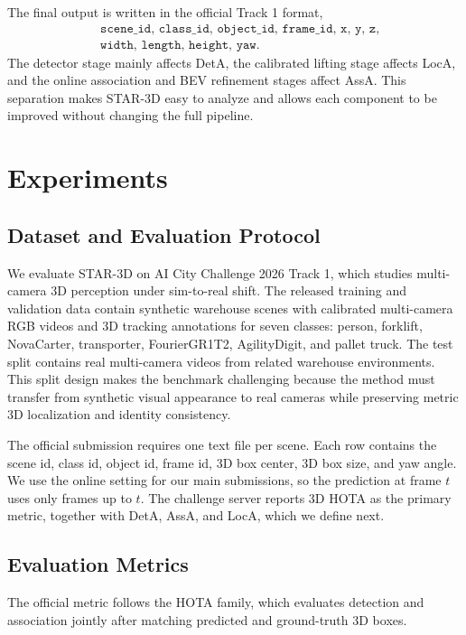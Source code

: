 \documentclass[runningheads]{llncs}
\begin{document}
The final output is written in the official Track 1 format,
\[
\begin{aligned}
&\texttt{scene\_id, class\_id, object\_id, frame\_id, x, y, z,}\\
&\texttt{width, length, height, yaw}.
\end{aligned}
\]
The detector stage mainly affects DetA, the calibrated lifting stage affects LocA,
and the online association and BEV refinement stages affect AssA. This separation
makes STAR-3D easy to analyze and allows each component to be improved without
changing the full pipeline.

\section{Experiments}
\label{sec:experiments}

\subsection{Dataset and Evaluation Protocol}
\label{sec:exp_dataset}

We evaluate STAR-3D on AI City Challenge 2026 Track 1, which studies multi-camera
3D perception under sim-to-real shift. The released training and validation data
contain synthetic warehouse scenes with calibrated multi-camera RGB videos and 3D
tracking annotations for seven classes: person, forklift, NovaCarter, transporter,
FourierGR1T2, AgilityDigit, and pallet truck. The test split contains real
multi-camera videos from related warehouse environments. This split design makes
the benchmark challenging because the method must transfer from synthetic visual
appearance to real cameras while preserving metric 3D localization and identity
consistency.

The official submission requires one text file per scene. Each row contains the
scene id, class id, object id, frame id, 3D box center, 3D box size, and yaw angle.
We use the online setting for our main submissions, so the prediction at frame
$t$ uses only frames up to $t$. The challenge server reports 3D HOTA as the
primary metric, together with DetA, AssA, and LocA, which we define next.

\subsection{Evaluation Metrics}
\label{sec:exp_metrics}

The official metric follows the HOTA family, which evaluates detection and
association jointly after matching predicted and ground-truth 3D boxes.
\end{document}
